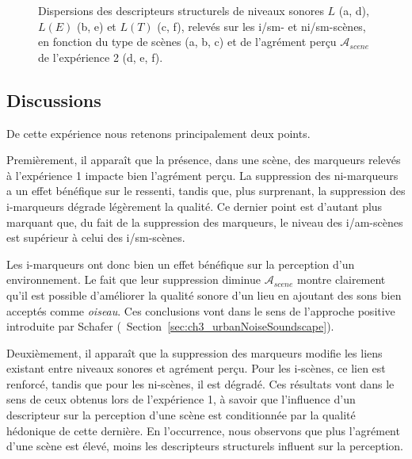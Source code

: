 \begin{figure}[t]
        \caption{Dispersions  des descripteurs structurels de niveaux sonores $L$ (a, d), $L(E)$ (b, e) et $L(T)$ (c, f), relevés sur les i/sm- et ni/sm-scènes, en fonction du type de scènes (a, b, c) et de l'agrément perçu $\mathcal{A}_{scene}$ de l'expérience 2 (d, e, f).}\label{fig:soundlevelSansMarker}
\end{figure}

\subsection{Discussions} 

De cette expérience nous retenons principalement deux points.

Premièrement, il apparaît que la présence, dans une scène, des marqueurs relevés à l'expérience 1 impacte bien l'agrément perçu. La suppression des ni-marqueurs a un effet bénéfique sur le ressenti, tandis que, plus surprenant, la suppression des i-marqueurs dégrade légèrement la qualité. Ce dernier point est d'autant plus marquant que, du fait de la suppression des marqueurs, le niveau des i/am-scènes est supérieur à celui des i/sm-scènes.

Les i-marqueurs ont donc bien un effet bénéfique sur la perception d'un environnement. Le fait que leur suppression diminue $\mathcal{A}_{scene}$ montre clairement qu'il est possible d'améliorer la qualité sonore d'un lieu en ajoutant des sons bien acceptés comme \emph{oiseau}. Ces conclusions vont dans le sens de l'approche positive  introduite par Schafer \citep{schafer1977tuning} (\cf~Section~\ref{sec:ch3_urbanNoiseSoundscape}).

Deuxièmement, il apparaît que la suppression des marqueurs modifie les liens existant entre niveaux sonores et agrément perçu. Pour les i-scènes, ce lien est renforcé, tandis que pour les ni-scènes, il est dégradé. Ces résultats vont dans le sens de ceux obtenus lors de l'expérience 1, à savoir que l'influence d'un descripteur sur la perception d'une scène est conditionnée par la qualité hédonique de cette dernière. En l'occurrence, nous observons que plus l'agrément d'une scène est élevé, moins les descripteurs structurels influent sur la perception.

